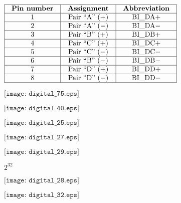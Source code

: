 \documentclass[12pt,a4paper,margin=2cm]{book}
\def\lthtmlcheckvsize{\ifdim\ht\sizebox<\vsize 
  \ifdim\wd\sizebox<\hsize\expandafter\hfill\fi \expandafter\vfill
  \else\expandafter\vss\fi}%
\begin{document}
{\newpage\clearpage
{}%
$\displaystyle \vbox{\offinterlineskip
\halign{\strut
\vrule \quad\hfil # \  \hfil & 
\vrule \quad\hfil # \  \hfil & 
\vrule \quad\hfil # \  \hfil \vrule \cr
\noalign{\hrule }
\textbf{Pin number} & \textbf{Assignment} & \textbf{Abbreviation} \cr
\noalign{\hrule }
1 & Pair ``A'' (+) & BI\_DA+ \cr
\noalign{\hrule }
2 & Pair ``A'' ($-$) & BI\_DA$-$ \cr
\noalign{\hrule }
3 & Pair ``B'' (+) & BI\_DB+ \cr
\noalign{\hrule }
4 & Pair ``C'' (+) & BI\_DC+ \cr
\noalign{\hrule }
5 & Pair ``C'' ($-$) & BI\_DC$-$ \cr
\noalign{\hrule }
6 & Pair ``B'' ($-$) & BI\_DB$-$ \cr
\noalign{\hrule }
7 & Pair ``D'' (+) & BI\_DD+ \cr
\noalign{\hrule }
8 & Pair ``D'' ($-$) & BI\_DD$-$ \cr
\noalign{\hrule }
} %
}$%
\lthtmlindisplaymathZ
\lthtmlcheckvsize\clearpage}

{\newpage\clearpage
{}%
$\displaystyle \texttt{[image: digital\_75.eps]}$%
\lthtmlindisplaymathZ
\lthtmlcheckvsize\clearpage}

{\newpage\clearpage
{}%
$\displaystyle \texttt{[image: digital\_40.eps]}$%
\lthtmlindisplaymathZ
\lthtmlcheckvsize\clearpage}

{\newpage\clearpage
{}%
$\displaystyle \texttt{[image: digital\_25.eps]}$%
\lthtmlindisplaymathZ
\lthtmlcheckvsize\clearpage}

{\newpage\clearpage
{}%
$\displaystyle \texttt{[image: digital\_27.eps]}$%
\lthtmlindisplaymathZ
\lthtmlcheckvsize\clearpage}

{\newpage\clearpage
{}%
$\displaystyle \texttt{[image: digital\_29.eps]}$%
\lthtmlindisplaymathZ
\lthtmlcheckvsize\clearpage}

{\newpage\clearpage
{}%
$ 2^{32}$%
\lthtmlindisplaymathZ
\lthtmlcheckvsize\clearpage}

{\newpage\clearpage
{}%
$\displaystyle \texttt{[image: digital\_28.eps]}$%
\lthtmlindisplaymathZ
\lthtmlcheckvsize\clearpage}

{\newpage\clearpage
{}%
$\displaystyle \texttt{[image: digital\_32.eps]}$%
\lthtmlindisplaymathZ
\lthtmlcheckvsize\clearpage}
\end{document}
